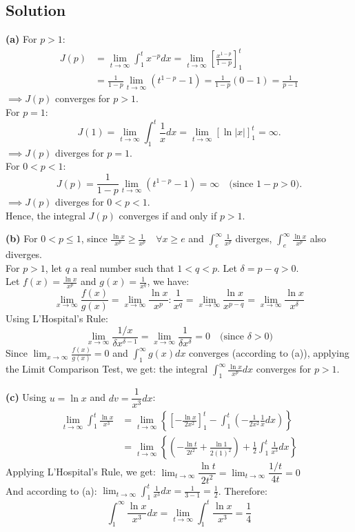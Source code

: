 \subsection*{Solution}
\textbf{(a)}
For $p > 1$:
\begin{align*}
J(p) &= \lim_{t \to \infty} \int_{1}^{t} x^{-p} dx = \lim_{t \to \infty} \left[ \frac{x^{1-p}}{1-p} \right]_{1}^{t} \\
&= \frac{1}{1-p} \lim_{t \to \infty} \left( t^{1-p} - 1\right) = \frac{1}{1-p} (0 - 1) = \frac{1}{p-1}
\end{align*}
$\implies J(p)$ converges for $p > 1$.\\
For $p=1$:
    $$J(1) = \lim_{t \to \infty} \int_{1}^{t} \frac{1}{x} dx = \lim_{t \to \infty} \left[ \ln|x| \right]_{1}^{t} = \infty.$$
    $\implies J(p)$ diverges for $p=1$.\\
For $0 < p < 1$:
    $$J(p) = \frac{1}{1-p} \lim_{t \to \infty} \left( t^{1-p} - 1 \right) = \infty \quad \text{(since } 1-p > 0).$$
    $\implies J(p)$ diverges for $0 < p < 1$.\\
Hence, the integral $J(p)$ converges if and only if $p > 1$.


\textbf{(b)}
For $0<p\le1$, since $\frac{\ln x}{x^p}\ge\frac{1}{x^p}\quad \forall x\ge e$ and $\int_e^\infty\frac{1}{x^p}$ diverges, $\int_e^\infty\frac{\ln x}{x^p}$ also diverges.\\
For $p>1$, let $q$ a real number such that $1<q<p$. Let $\delta = p-q > 0$.\\
Let $f(x)=\frac{\ln x}{x^p}$ and $g(x) = \frac{1}{x^q}$, we have:
$$\lim_{x \to \infty}\frac{f(x)}{g(x)}=\lim_{x \to \infty} \frac{\ln x}{x^p}:\frac{1}{x^q} = \lim_{x \to \infty} \frac{\ln x}{x^{p-q}} = \lim_{x \to \infty} \frac{\ln x}{x^\delta}$$
Using L'Hospital's Rule:
$$\lim_{x \to \infty} \frac{1/x}{\delta x^{\delta-1}} = \lim_{x \to \infty} \frac{1}{\delta x^\delta} = 0\quad\text{(since }\delta>0)$$
Since $\lim_{x \to \infty}\frac{f(x)}{g(x)} = 0$ and $\int_{1}^{\infty} g(x) dx$ converges (according to (a)), applying the Limit Comparison Test, we get: the integral $\int_{1}^{\infty} \frac{\ln x}{x^p} dx$ converges for $p > 1$.

\textbf{(c)}
Using $u = \ln x$ and $dv = \dfrac{1}{x^3} dx$:
\begin{align*}
    \lim_{t\to\infty}\int_1^t\frac{\ln x}{x^3}
    &=\lim_{t \to \infty}\left\{ \left[-\frac{\ln x}{2x^2}\right]_{1}^{t} - \int_1^t \left( -\frac{1}{2x^2} \frac{1}{x} dx \right) \right\} \\
    &= \lim_{t \to \infty} \left\{\left( -\frac{\ln t}{2t^2} + \frac{\ln 1}{2(1)^2} \right) + \frac{1}{2} \int_{1}^{t} \frac{1}{x^3} dx\right\}
\end{align*}
Applying L'Hospital's Rule, we get: $\lim_{t \to \infty} \dfrac{\ln t}{2t^2} = \lim_{t \to \infty} \dfrac{1/t}{4t} = 0$\\ And according to (a): $\lim_{t\to\infty}\int_{1}^{t} \frac{1}{x^3} dx=\frac{1}{3-1}=\frac{1}{2}$. Therefore:
$$\int_{1}^{\infty} \frac{\ln x}{x^3} dx= \lim_{t\to\infty}\int_1^t\frac{\ln x}{x^3} =\frac{1}{4}$$

